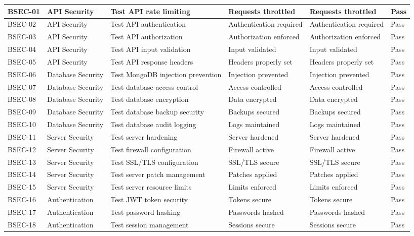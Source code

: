 {\begin{longtable}{|C{1.5cm}|C{2.5cm}|C{3.5cm}|C{2.5cm}|C{2.5cm}|C{1.5cm}|}
BSEC-01 & API Security & Test API rate limiting & Requests throttled & Requests throttled & Pass \\
\hline
BSEC-02 & API Security & Test API authentication & Authentication required & Authentication required & Pass \\
\hline
BSEC-03 & API Security & Test API authorization & Authorization enforced & Authorization enforced & Pass \\
\hline
BSEC-04 & API Security & Test API input validation & Input validated & Input validated & Pass \\
\hline
BSEC-05 & API Security & Test API response headers & Headers properly set & Headers properly set & Pass \\
\hline
BSEC-06 & Database Security & Test MongoDB injection prevention & Injection prevented & Injection prevented & Pass \\
\hline
BSEC-07 & Database Security & Test database access control & Access controlled & Access controlled & Pass \\
\hline
BSEC-08 & Database Security & Test database encryption & Data encrypted & Data encrypted & Pass \\
\hline
BSEC-09 & Database Security & Test database backup security & Backups secured & Backups secured & Pass \\
\hline
BSEC-10 & Database Security & Test database audit logging & Logs maintained & Logs maintained & Pass \\
\hline
BSEC-11 & Server Security & Test server hardening & Server hardened & Server hardened & Pass \\
\hline
BSEC-12 & Server Security & Test firewall configuration & Firewall active & Firewall active & Pass \\
\hline
BSEC-13 & Server Security & Test SSL/TLS configuration & SSL/TLS secure & SSL/TLS secure & Pass \\
\hline
BSEC-14 & Server Security & Test server patch management & Patches applied & Patches applied & Pass \\
\hline
BSEC-15 & Server Security & Test server resource limits & Limits enforced & Limits enforced & Pass \\
\hline
BSEC-16 & Authentication & Test JWT token security & Tokens secure & Tokens secure & Pass \\
\hline
BSEC-17 & Authentication & Test password hashing & Passwords hashed & Passwords hashed & Pass \\
\hline
BSEC-18 & Authentication & Test session management & Sessions secure & Sessions secure & Pass \\

\end{longtable}}

